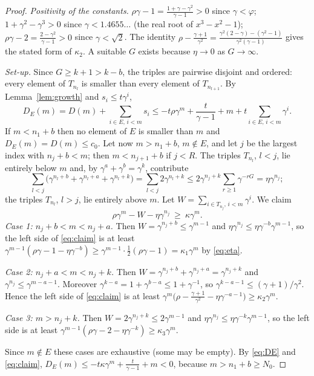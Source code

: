 \documentclass[11pt]{amsart}
\theoremstyle{definition}
\theoremstyle{remark}
\begin{document}
\begin{proof}
\emph{Positivity of the constants.} $\rho\gamma-1=\frac{1+\gamma-\gamma^2}{\gamma-1}>0$ since
$\gamma<\varphi$; $1+\gamma^2-\gamma^3>0$ since $\gamma<1.4655\ldots$ (the real root of
$x^3-x^2-1$); $\rho\gamma-2=\frac{2-\gamma^2}{\gamma-1}>0$ since $\gamma<\sqrt2$. The identity
$\rho-\frac{\gamma+1}{\gamma^2}=\frac{\gamma^2(2-\gamma)-(\gamma^2-1)}{\gamma^2(\gamma-1)}$ gives
the stated form of $\kappa_2$. A suitable $G$ exists because $\eta\to0$ as $G\to\infty$.

\emph{Set-up.} Since $G\ge k+1>k-b$, the triples are pairwise disjoint and ordered: every
element of $T_{n_l}$ is smaller than every element of $T_{n_{l+1}}$. By
Lemma~\ref{lem:growth} and $s_i\le t\gamma^i$,
\begin{equation}\label{eq:DE}
  D_E(m)=D(m)+\sum_{i\in E,\,i<m}s_i\le -t\rho\gamma^m+\frac t{\gamma-1}+m+t\sum_{i\in E,\,i<m}\gamma^i .
\end{equation}
If $m<n_1+b$ then no element of $E$ is smaller than $m$ and $D_E(m)=D(m)\le c_0$. Let now
$m>n_1+b$, $m\notin E$, and let $j$ be the largest index with $n_j+b<m$; then $m<n_{j+1}+b$ if
$j<R$. The triples $T_{n_l}$, $l<j$, lie entirely below $m$ and, by
$\gamma^a+\gamma^b=\gamma^k$, contribute
\[
  \sum_{l<j}\bigl(\gamma^{n_l+b}+\gamma^{n_l+a}+\gamma^{n_l+k}\bigr)=\sum_{l<j}2\gamma^{n_l+k}
  \le2\gamma^{n_j+k}\sum_{r\ge1}\gamma^{-rG}=\eta\gamma^{n_j};
\]
the triples $T_{n_l}$, $l>j$, lie entirely above $m$. Let
$W=\sum_{i\in T_{n_j},\,i<m}\gamma^i$. We claim
\begin{equation}\label{eq:claim}
  \rho\gamma^m-W-\eta\gamma^{n_j}\ \ge\ \kappa\gamma^m .
\end{equation}
\emph{Case 1: $n_j+b<m<n_j+a$.} Then $W=\gamma^{n_j+b}\le\gamma^{m-1}$ and
$\eta\gamma^{n_j}\le\eta\gamma^{-b}\gamma^{m-1}$, so the left side of \eqref{eq:claim} is at least
$\gamma^{m-1}(\rho\gamma-1-\eta\gamma^{-b})\ge\gamma^{m-1}\cdot\frac12(\rho\gamma-1)=\kappa_1\gamma^m$
by \eqref{eq:eta}.

\emph{Case 2: $n_j+a<m<n_j+k$.} Then $W=\gamma^{n_j+b}+\gamma^{n_j+a}=\gamma^{n_j+k}$ and
$\gamma^{n_j}\le\gamma^{m-a-1}$. Moreover $\gamma^{k-a}=1+\gamma^{b-a}\le1+\gamma^{-1}$, so
$\gamma^{k-a-1}\le(\gamma+1)/\gamma^2$. Hence the left side of \eqref{eq:claim} is at least
$\gamma^m\bigl(\rho-\frac{\gamma+1}{\gamma^2}-\eta\gamma^{-a-1}\bigr)\ge\kappa_2\gamma^m$.

\emph{Case 3: $m>n_j+k$.} Then $W=2\gamma^{n_j+k}\le2\gamma^{m-1}$ and
$\eta\gamma^{n_j}\le\eta\gamma^{-k}\gamma^{m-1}$, so the left side is at least
$\gamma^{m-1}(\rho\gamma-2-\eta\gamma^{-k})\ge\kappa_3\gamma^m$.

Since $m\notin E$ these cases are exhaustive (some may be empty). By \eqref{eq:DE} and
\eqref{eq:claim}, $D_E(m)\le-t\kappa\gamma^m+\frac t{\gamma-1}+m<0$, because
$m>n_1+b\ge N_0$.
\end{proof}
\end{document}
